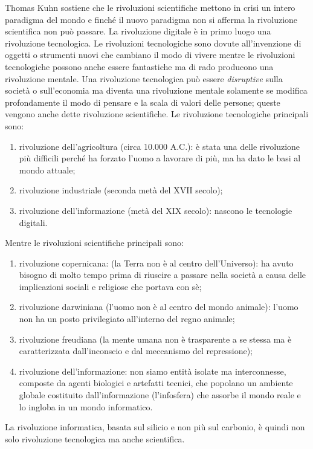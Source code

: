 \documentclass[a4page, 11pt]{article}
\begin{document}
Thomas Kuhn sostiene che le rivoluzioni scientifiche mettono in crisi un intero paradigma del mondo e finché il nuovo paradigma non si afferma la rivoluzione scientifica non può passare.
La rivoluzione digitale è in primo luogo una rivoluzione tecnologica.
Le rivoluzioni tecnologiche sono dovute all'invenzione di oggetti o strumenti nuovi che cambiano il modo di vivere mentre le rivoluzioni tecnologiche possono anche essere fantastiche ma di rado producono una rivoluzione mentale.
Una rivoluzione tecnologica può essere \textit{disruptive} sulla società o sull'economia ma diventa una rivoluzione mentale solamente se modifica profondamente il modo di pensare e la scala di valori delle persone; queste vengono anche dette rivoluzione scientifiche.
Le rivoluzione tecnologiche principali sono:
\begin{enumerate}
  \def\labelenumi{\arabic{enumi}.}
  \item rivoluzione dell'agricoltura (circa 10.000 A.C.): è stata una delle rivoluzione più difficili perché ha forzato l'uomo a lavorare di più, ma ha dato le basi al mondo attuale;
  \item rivoluzione industriale (seconda metà del XVII secolo);
  \item rivoluzione dell'informazione (metà del XIX secolo): nascono le tecnologie digitali.
\end{enumerate}
Mentre le rivoluzioni scientifiche principali sono:
\begin{enumerate}
  \def\labelenumi{\arabic{enumi}.}
  \item rivoluzione copernicana: (la Terra non è al centro dell'Universo): ha avuto bisogno di molto tempo prima di riuscire a passare nella società a causa delle implicazioni sociali e religiose che portava con sè;
  \item rivoluzione darwiniana (l'uomo non è al centro del mondo animale): l'uomo non ha un posto privilegiato all'interno del regno animale;
  \item rivoluzione freudiana (la mente umana non è trasparente a se stessa ma è caratterizzata dall'inconscio e dal meccanismo del repressione);
  \item rivoluzione dell'informazione: non siamo entità isolate ma interconnesse, composte da agenti biologici e artefatti tecnici, che popolano un ambiente globale costituito dall'informazione (l'infosfera) che assorbe il mondo reale e lo ingloba in un mondo informatico.
\end{enumerate}
La rivoluzione informatica, basata sul silicio e non più sul carbonio, è quindi non solo rivoluzione tecnologica ma anche scientifica.
\end{document}
